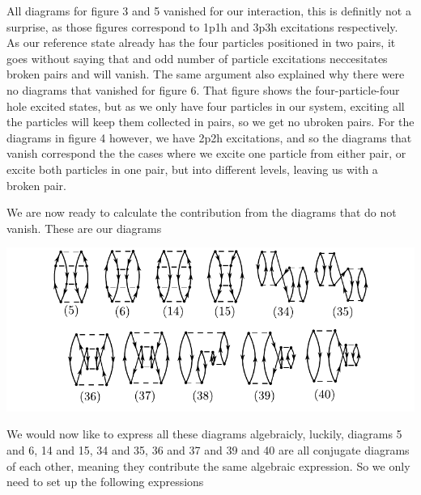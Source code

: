 \documentclass[a4paper, 11pt, notitlepage, english]{article}
\begin{document}
All diagrams for figure 3 and 5 vanished for our interaction, this is definitly not a surprise, as those figures correspond to 1p1h and 3p3h excitations respectively. As our reference state already has the four particles positioned in two pairs, it goes without saying that and odd number of particle excitations neccesitates broken pairs and will vanish. The same argument also explained why there were no diagrams that vanished for figure 6. That figure shows the four-particle-four hole excited states, but as we only have four particles in our system, exciting all the particles will keep them collected in pairs, so we get no ubroken pairs. For the diagrams in figure 4 however, we have 2p2h excitations, and so the diagrams that vanish correspond the the cases where we excite one particle from either pair, or excite both particles in one pair, but into different levels, leaving us with a broken pair.

\clearpage

We are now ready to calculate the contribution from the diagrams that do not vanish. These are our diagrams

\includegraphics[width=\textwidth]{project2_7}

We would now like to express all these diagrams algebraicly, luckily, diagrams 5 and 6, 14 and 15, 34 and 35, 36 and 37 and 39 and 40 are all conjugate diagrams of each other, meaning they contribute the same algebraic expression. So we only need to set up the following expressions
\end{document}
